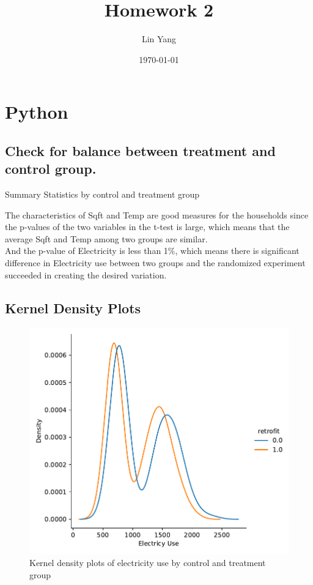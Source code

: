 \documentclass{article}
\title{Homework 2}
\author{Lin Yang}
\date{\today}
\begin{document}
  
\maketitle
\section{Python}

\subsection{Check for balance between treatment and control group.}

\begin{table}[ht]
	\centering
	
	\caption{Summary Statistics by control and treatment group}
\end{table}
The characteristics of Sqft and Temp are good measures for the households since the p-values of the two variables in the t-test is large, which means that the average Sqft and Temp among two groups are similar. \\ And the p-value of Electricity is less than 1\%, which means there is significant difference in Electricity use between two groups and the randomized experiment succeeded in creating the desired variation.
	
\subsection{Kernel Density Plots}

\begin{figure}[ht]
	\centering
	\includegraphics[scale = 0.5]{q2.pdf}
	\caption{Kernel density plots of electricity use by control and treatment group}
\end{figure}
\end{document}
